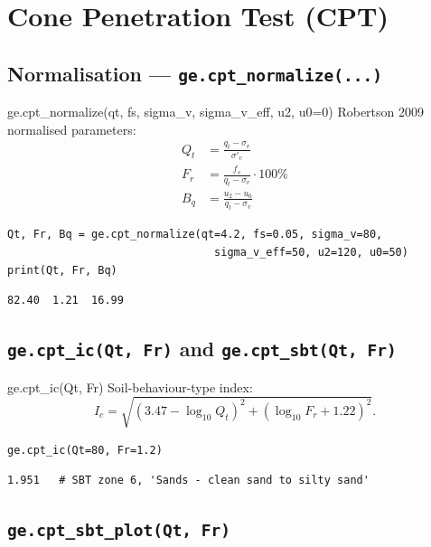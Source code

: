 \documentclass[11pt,a4paper,openany]{book}
\newcommand{\sigmav}{\sigma_v}
\newcommand{\sigmavp}{\sigma'_v}
\begin{document}
\section{Cone Penetration Test (CPT)}\label{sec:cpt}

\subsection{Normalisation --- \texttt{ge.cpt\_normalize(...)}}

\begin{funcbox}{ge.cpt\_normalize(qt, fs, sigma\_v, sigma\_v\_eff, u2, u0=0)}
Robertson 2009 normalised parameters:
\begin{align}
Q_t &= \frac{q_t - \sigmav}{\sigmavp} \\
F_r &= \frac{f_s}{q_t - \sigmav}\cdot 100\% \\
B_q &= \frac{u_2 - u_0}{q_t - \sigmav}
\end{align}
\end{funcbox}

\begin{lstlisting}
Qt, Fr, Bq = ge.cpt_normalize(qt=4.2, fs=0.05, sigma_v=80,
                                sigma_v_eff=50, u2=120, u0=50)
print(Qt, Fr, Bq)
\end{lstlisting}
\begin{lstlisting}[style=output]
82.40  1.21  16.99
\end{lstlisting}

\subsection{\texttt{ge.cpt\_ic(Qt, Fr)} and \texttt{ge.cpt\_sbt(Qt, Fr)}}

\begin{funcbox}{ge.cpt\_ic(Qt, Fr)}
Soil-behaviour-type index:
\[
I_c = \sqrt{(3.47 - \log_{10} Q_t)^2 + (\log_{10} F_r + 1.22)^2}.
\]
\end{funcbox}

\begin{lstlisting}
ge.cpt_ic(Qt=80, Fr=1.2)
\end{lstlisting}
\begin{lstlisting}[style=output]
1.951   # SBT zone 6, 'Sands - clean sand to silty sand'
\end{lstlisting}

\subsection{\texttt{ge.cpt\_sbt\_plot(Qt, Fr)}}
\end{document}
